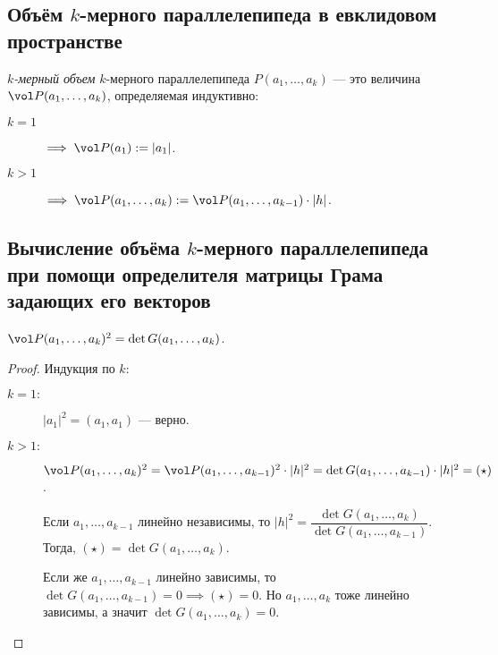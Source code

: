 \subsection{Объём $k$-мерного параллелепипеда в евклидовом пространстве}

\begin{definition}
    \textit{$k$-мерный объем} $k$-мерного параллелепипеда $P(a_1, \dots, a_k)$ --- это величина $\vol P(a_1, \dots, a_k)$, определяемая индуктивно:

    \begin{description}
    \item[$k = 1$] $\implies \vol P(a_1) := |a_1|$.
    \item[$k > 1$] $\implies \vol P(a_1, \dots, a_k) := \vol P(a_1, \dots, a_{k - 1}) \cdot |h|$.
    \end{description}
\end{definition}


\subsection{Вычисление объёма $k$-мерного параллелепипеда при помощи определителя матрицы Грама задающих его векторов}

\begin{theorem}
    $\vol P(a_1, \dots, a_k)^2 = \det G(a_1, \dots, a_k)$.
\end{theorem}

\begin{proof}
    Индукция по $k$:

    \begin{description}
    \item[$k = 1:$] $|a_1|^2 = (a_1, a_1)$ --- верно.
    \item[$k > 1:$] $\vol P(a_1, \dots, a_k)^2 = \vol P(a_1, \dots, a_{k - 1})^2 \cdot |h|^2 = \det G(a_1, \dots, a_{k - 1}) \cdot |h|^2 = (\star)$.

        Если $a_1, \dots, a_{k - 1}$ линейно независимы, то $|h|^2 = \dfrac{\det G(a_1, \dots, a_k)}{\det G(a_1, \dots, a_{k - 1})}$.
        Тогда, $(\star) = \det G(a_1, \dots, a_k)$.

        Если же $a_1, \dots, a_{k - 1}$ линейно зависимы, то $\det G(a_1, \dots, a_{k - 1}) = 0 \implies (\star) = 0$. Но $a_1, \dots, a_k$ тоже линейно зависимы, а значит $\det G(a_1, \dots, a_k) = 0$.
        \qedhere
    \end{description}
\end{proof}

